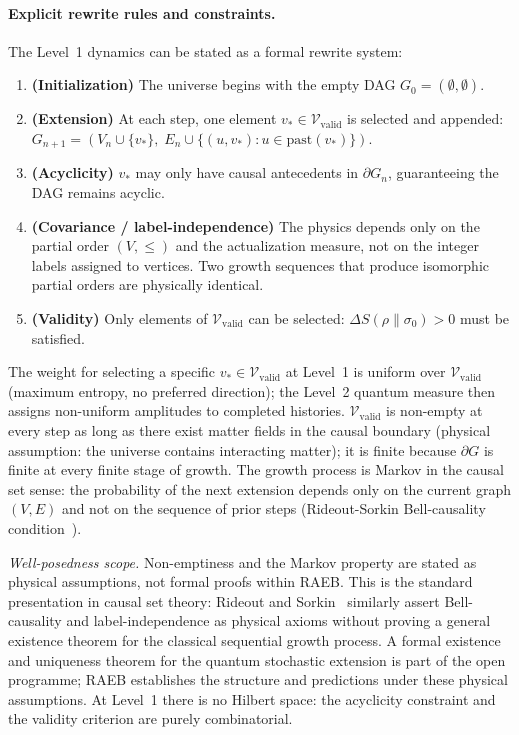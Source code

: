 \documentclass[11pt,a4paper]{article}
\theoremstyle{plain}
\theoremstyle{definition}
\theoremstyle{remark}
\newcommand{\Vvalid}{\mathcal{V}_{\mathrm{valid}}}
\begin{document}
\paragraph{Explicit rewrite rules and constraints.}
The Level~1 dynamics can be stated as a formal rewrite system:

\begin{enumerate}[noitemsep,label=\textbf{R\arabic*.}]
  \item \textbf{(Initialization)} The universe begins with the empty DAG
    $G_0 = (\emptyset, \emptyset)$.
  \item \textbf{(Extension)} At each step, one element $v_* \in \Vvalid$ is
    selected and appended: $G_{n+1} = (V_n \cup \{v_*\},\; E_n \cup
    \{(u, v_*) : u \in \mathrm{past}(v_*)\})$.
  \item \textbf{(Acyclicity)} $v_*$ may only have causal antecedents in
    $\partial G_n$, guaranteeing the DAG remains acyclic.
  \item \textbf{(Covariance / label-independence)} The physics depends only
    on the partial order $(V, \leq)$ and the actualization measure, not on
    the integer labels assigned to vertices. Two growth sequences that produce
    isomorphic partial orders are physically identical.
  \item \textbf{(Validity)} Only elements of $\Vvalid$ can be selected:
    $\Delta S(\rho\|\sigma_0) > 0$ must be satisfied.
\end{enumerate}

The weight for selecting a specific $v_* \in \Vvalid$ at Level~1 is uniform
over $\Vvalid$ (maximum entropy, no preferred direction); the Level~2 quantum
measure then assigns non-uniform amplitudes to completed histories.
$\Vvalid$ is non-empty at every step as long as there exist matter fields
in the causal boundary (physical assumption: the universe contains
interacting matter); it is finite because $\partial G$ is finite
at every finite stage of growth. The growth process is Markov in the
causal set sense: the probability of the next extension depends only on
the current graph $(V, E)$ and not on the sequence of prior steps
(Rideout-Sorkin Bell-causality condition~\citep{RideoutSorkin2000}).

\noindent\textit{Well-posedness scope.} Non-emptiness and the Markov property
are stated as physical assumptions, not formal proofs within RAEB.
This is the standard presentation in causal set theory: Rideout and
Sorkin~\citep{RideoutSorkin2000} similarly assert Bell-causality and
label-independence as physical axioms without proving a general existence
theorem for the classical sequential growth process.
A formal existence and uniqueness theorem for the quantum stochastic
extension is part of the open programme; RAEB establishes the structure
and predictions under these physical assumptions.
At Level~1 there is no Hilbert space: the acyclicity constraint and the
validity criterion are purely combinatorial.
\end{document}
